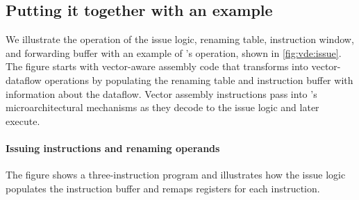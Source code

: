 \subsection{Putting it together with an example}
We illustrate the operation of the issue logic, renaming table, instruction
window, and forwarding buffer with an example of \manic's operation, shown in
\autoref{fig:vde:issue}. 
%
The figure starts with vector-aware assembly code that \manic transforms into
vector-dataflow operations by populating the renaming table and instruction
buffer with information about the dataflow.
%
Vector assembly instructions pass into \manic's microarchitectural mechanisms
as they decode to the issue logic and later execute.
%

\figMANICMANICa

\paragraph{Issuing instructions and renaming operands}
The figure shows a three-instruction program and illustrates how
the issue logic populates the instruction buffer and remaps registers for each
instruction.

